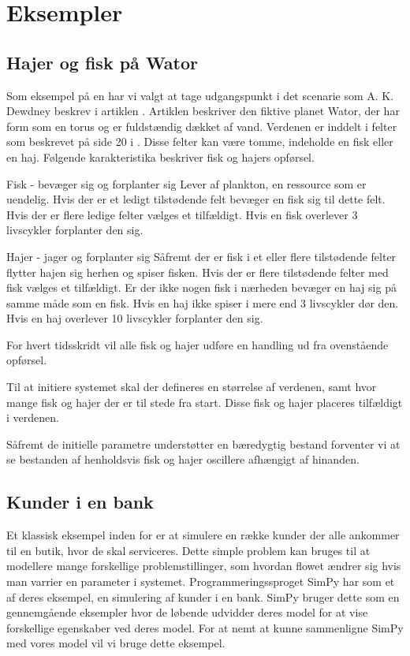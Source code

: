 \chapter{Eksempler}

\section{Hajer og fisk på Wator} Som eksempel på en \des har vi valgt at tage 
udgangspunkt i det scenarie som A. K. Dewdney
beskrev i artiklen . Artiklen beskriver den
fiktive planet Wator, der har form som en torus og er fuldstændig
dækket af vand. Verdenen er inddelt i felter som beskrevet på side
20 i . Disse felter kan være tomme, indeholde en
fisk eller en haj. Følgende karakteristika beskriver fisk og hajers
opførsel.


Fisk - bevæger sig og forplanter sig Lever af plankton, en ressource
som er uendelig. Hvis der er et ledigt tilstødende felt bevæger en
fisk sig til dette felt. Hvis der er flere ledige felter vælges et
tilfældigt. Hvis en fisk overlever 3 livscykler forplanter den sig.


Hajer - jager og forplanter sig Såfremt der er fisk i et eller flere
tilstødende felter flytter hajen sig herhen og spiser fisken. Hvis der
er flere tilstødende felter med fisk vælges et tilfældigt. Er der
ikke nogen fisk i nærheden bevæger en haj sig på samme måde som en
fisk. Hvis en haj ikke spiser i mere end 3 livscykler dør den. Hvis en
haj overlever 10 livscykler forplanter den sig.

For hvert tidsskridt vil alle fisk og hajer udføre en handling ud fra
ovenstående opførsel.

Til at initiere systemet skal der defineres en størrelse af verdenen,
samt hvor mange fisk og hajer der er til stede fra start. Disse fisk og
hajer placeres tilfældigt i verdenen.

Såfremt de initielle parametre understøtter en bæredygtig bestand
forventer vi at se bestanden af henholdsvis fisk og hajer oscillere
afhængigt af hinanden.

\section{Kunder i en bank} Et klassisk eksempel inden for \des er at simulere  
en række kunder der alle ankommer til en butik, hvor de skal serviceres. Dette 
simple problem kan bruges til at modellere mange forskellige 
problemstillinger, som hvordan flowet ændrer sig hvis man varrier en parameter 
i systemet. Programmeringssproget SimPy har som et af deres eksempel, en 
simulering af kunder i en bank. SimPy bruger dette som en gennemgående 
eksempler hvor de løbende udvidder deres model for at vise forskellige 
egenskaber ved deres model. For at nemt at kunne sammenligne SimPy  med vores 
model vil vi bruge dette eksempel.

